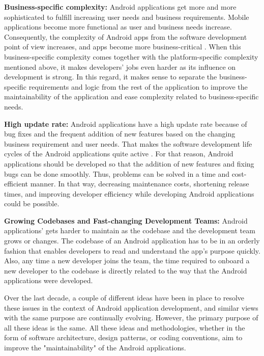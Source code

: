 \noindent\textbf{Business-specific complexity:} Android applications get more and more sophisticated to fulfill increasing user needs and business requirements. Mobile applications become more functional as user and business needs increase. Consequently, the complexity of Android apps from the software development point of view increases, and apps become more business-critical \cite{2}. When this business-specific complexity comes together with the platform-specific complexity mentioned above, it makes developers’ jobs even harder as its influence on development is strong. In this regard, it makes sense to separate the business-specific requirements and logic from the rest of the application to improve the maintainability of the application and ease complexity related to business-specific needs.

\noindent\textbf{High update rate:} Android applications have a high update rate because of bug fixes and the frequent addition of new features based on the changing business requirement and user needs. That makes the software development life cycles of the Android applications quite active \cite{3}. For that reason, Android applications should be developed so that the addition of new features and fixing bugs can be done smoothly. Thus, problems can be solved in a time and cost-efficient manner. In that way, decreasing maintenance costs, shortening release times, and improving developer efficiency while developing Android applications could be possible.

\noindent\textbf{Growing Codebases and Fast-changing Development Teams:} Android applications' gets harder to maintain as the codebase and the development team grows or changes. The codebase of an Android application has to be in an orderly fashion that enables developers to read and understand the app's purpose quickly. Also, any time a new developer joins the team, the time required to onboard a new developer to the codebase is directly related to the way that the Android applications were developed.

Over the last decade, a couple of different ideas have been in place to resolve these issues in the context of Android application development, and similar views with the same purpose are continually evolving. However, the primary purpose of all these ideas is the same. All these ideas and methodologies, whether in the form of software architecture, design patterns, or coding conventions, aim to improve the "maintainability" of the Android applications.

